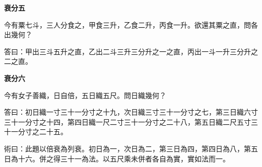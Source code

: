 \documentclass[11pt,a4paper]{article}
\newenvironment{problemenv}[1]{%
  \medskip\noindent\textbf{#1}\par\nopagebreak\smallskip
}{\medskip}
\begin{document}
\begin{problemenv}{衰分五}
今有粟七斗，三人分食之，甲食三升，乙食二升，丙食一升。欲還其粟之直，問各出幾何？

\textsf{答曰：}甲出三斗五升之直，乙出二斗三升三分升之一之直，丙出一斗一升三分升之二之直。
\end{problemenv}

\begin{problemenv}{衰分六}
今有女子善織，日自倍，五日織五尺。問日織幾何？

\textsf{答曰：}初日織一寸三十一分寸之十九，次日織三寸三十一分寸之七，第三日織六寸三十一分寸之十四，第四日織一尺二寸三十一分寸之二十八，第五日織二尺五寸三十一分寸之二十五。

\textsf{術曰：}此題以倍衰為列衰。初日為一，次日為二，第三日為四，第四日為八，第五日為十六。併之得三十一為法。以五尺乘未併者各自為實，實如法而一。
\end{problemenv}
\end{document}
